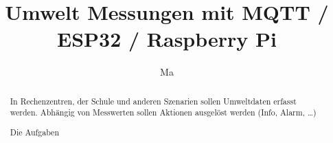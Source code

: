 \documentclass[a4paper,10pt]{scrartcl}
\title{Umwelt Messungen mit MQTT / ESP32 / Raspberry Pi}
\author{Ma}
\begin{document}
\maketitle

\begin{abstract}
In Rechenzentren, der Schule und anderen Szenarien sollen Umweltdaten erfasst werden. Abhängig von Messwerten sollen Aktionen ausgelöst werden (Info, Alarm, \dots)

Die Aufgaben
\end{abstract}

\section{}
\end{document}
